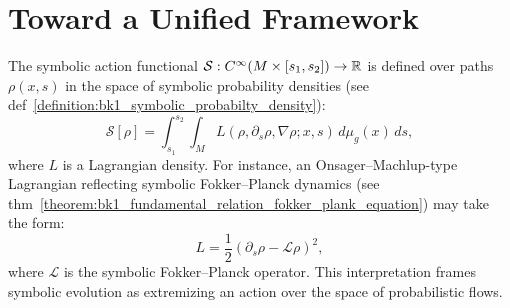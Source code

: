 \section{Toward a Unified Framework}
\label{sec:bk1_toward_a_unified_framework}

\begin{definition}
\label{definition:bk1_symbolic_action_functional}
The symbolic action functional $\mathcal{S}: C^\infty(M \times [s_1, s_2]) \to \mathbb{R}$ is defined over paths $\rho(x,s)$ in the space of symbolic probability densities (see def~\ref{definition:bk1_symbolic_probabilty_density}):
\[
\mathcal{S}[\rho] = \int_{s_1}^{s_2} \int_M L(\rho, \partial_s \rho, \nabla \rho; x, s) \, d\mu_g(x) \, ds,
\]
where $L$ is a Lagrangian density. For instance, an Onsager–Machlup-type Lagrangian reflecting symbolic Fokker–Planck dynamics (see thm~\ref{theorem:bk1_fundamental_relation_fokker_plank_equation}) may take the form:
\[
L = \frac{1}{2} \left( \partial_s \rho - \mathcal{L} \rho \right)^2,
\]
where $\mathcal{L}$ is the symbolic Fokker–Planck operator. This interpretation frames symbolic evolution as extremizing an action over the space of probabilistic flows.
\end{definition}

